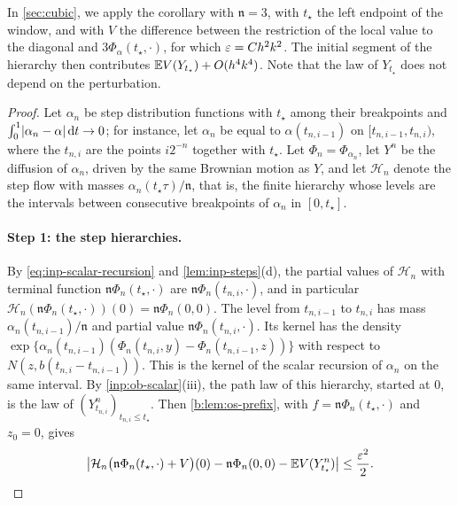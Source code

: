 In \cref{sec:cubic}, we apply the corollary with $\mathfrak n=3$, with $t_\star$ the left
endpoint of the window, and with $V$ the difference between the restriction of
the local value to the diagonal and $3\Phi_\alpha(t_\star,\cdot)$, for which
$\varepsilon=Ch^2k^2$. The initial segment of the hierarchy then contributes $\mathbb E V(Y_{t_\star})+O(h^4k^4)$. Note that
the law of $Y_{t_\star}$ does not depend on the perturbation.

\begin{proof}
Let $\alpha_n$ be step distribution functions with $t_\star$ among their breakpoints
and $\int_0^1\lvert \alpha_n-\alpha\rvert\,\mathrm d t\to0$; for instance, let $\alpha_n$ be
equal to $\alpha(t_{n,i-1})$ on $[t_{n,i-1},t_{n,i})$, where the $t_{n,i}$ are the
points $i2^{-n}$ together with $t_\star$. Let $\Phi_n=\Phi_{\alpha_n}$, let $Y^n$ be
the diffusion of $\alpha_n$, driven by the same Brownian motion as $Y$, and let
$\mathcal H_n$ denote the step flow with masses $\alpha_n(t_\star\tau)/\mathfrak n$, that is,
the finite hierarchy whose levels are the intervals between consecutive
breakpoints of $\alpha_n$ in $[0,t_\star]$.

\paragraph{Step 1: the step hierarchies.} By \eqref{eq:inp-scalar-recursion} and
\cref{lem:inp-steps}(d), the partial values of $\mathcal H_n$ with terminal
function $\mathfrak n\Phi_n(t_\star,\cdot)$ are $\mathfrak n\Phi_n(t_{n,i},\cdot)$, and in particular
$\mathcal H_n(\mathfrak n\Phi_n(t_\star,\cdot))(0)=\mathfrak n\Phi_n(0,0)$. The level from
$t_{n,i-1}$ to $t_{n,i}$ has mass $\alpha_n(t_{n,i-1})/\mathfrak n$ and partial value
$\mathfrak n\Phi_n(t_{n,i},\cdot)$. Its kernel has the density
$\exp\{\alpha_n(t_{n,i-1})(\Phi_n(t_{n,i},y)-\Phi_n(t_{n,i-1},z))\}$ with respect to
$N(z,b(t_{n,i}-t_{n,i-1}))$. This is the kernel of the scalar recursion of
$\alpha_n$ on the same interval.
By \cref{inp:ob-scalar}(iii), the path law of this hierarchy, started at $0$, is
the law of $(Y^n_{t_{n,i}})_{t_{n,i}\le t_\star}$. Then \cref{b:lem:os-prefix}, with
$f=\mathfrak n\Phi_n(t_\star,\cdot)$ and $z_0=0$, gives
\begin{equation}\label{eq:flow-prefix-step}
 \bigl\lvert\mathcal H_n\bigl(\mathfrak n\Phi_n(t_\star,\cdot)+V\bigr)(0)-\mathfrak n\Phi_n(0,0)
 -\mathbb E V(Y^n_{t_\star})\bigr\rvert\le\frac{\varepsilon^2}{2}.
\end{equation}


\end{proof}
